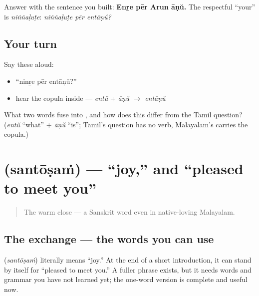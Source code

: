 \begin{grammarlens}[title={Grammar Lens: answer, and the respectful version}]
Answer with the sentence you built: \textbf{Enṟe pēr Arun āṇŭ.} The respectful \textquotedblleft{}your\textquotedblright{} is \emph{niṅṅaḷuṭe}: \emph{niṅṅaḷuṭe pēr entāṇŭ?}
\end{grammarlens}

\subsection*{Your turn}
Say these aloud:

\begin{itemize}
\raggedright
  \item \textquotedblleft{}ninṟe pēr entāṇŭ?\textquotedblright{}
  \item hear the copula inside — \emph{entŭ} + \emph{āṇŭ} $\to$ \emph{entāṇŭ}
\end{itemize}

\begin{tcolorbox}[breakable,colback=teal!4,colframe=teal!35!black,title={Before you move on}]
What two words fuse into \textbf{}, and how does this differ from the Tamil question? (\emph{entŭ} \textquotedblleft{}what\textquotedblright{} + \emph{āṇŭ} \textquotedblleft{}is\textquotedblright{}; Tamil's question has no verb, Malayalam's carries the copula.)
\end{tcolorbox}
\section[\texorpdfstring{\ml{സന്തോഷം} (santōṣaṁ)}{സന്തോഷം (santōṣaṁ)}]{ (santōṣaṁ) — \textquotedblleft{}joy,\textquotedblright{} and \textquotedblleft{}pleased to meet you\textquotedblright{}}

\label{lesson:ML-C02-santosham}



\begin{quote}
The warm close — a Sanskrit word even in native-loving Malayalam.
\end{quote}

\subsection*{The exchange — the words you can use}
\textbf{} (\emph{santōṣaṁ}) literally means \textquotedblleft{}joy.\textquotedblright{} At the end of a short introduction, it can stand by itself for \textquotedblleft{}pleased to meet you.\textquotedblright{} A fuller phrase exists, but it needs words and grammar you have not learned yet; the one-word version is complete and useful now.

